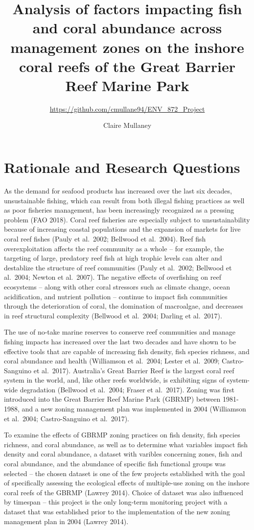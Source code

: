 \documentclass[12pt,]{article}
\title{Analysis of factors impacting fish and coral abundance across management
zones on the inshore coral reefs of the Great Barrier Reef Marine Park}
\subtitle{\url{https://github.com/cmullane94/ENV_872_Project}}
\author{Claire Mullaney}
\date{}
\begin{document}
\maketitle

\newpage
\tableofcontents 
\newpage
\listoftables 
\newpage
\listoffigures 
\newpage

\hypertarget{rationale-and-research-questions}{%
\section{Rationale and Research
Questions}\label{rationale-and-research-questions}}

As the demand for seafood products has increased over the last six
decades, unsustainable fishing, which can result from both illegal
fishing practices as well as poor fisheries management, has been
increasingly recognized as a pressing problem (FAO 2018). Coral reef
fisheries are especially subject to unsustainability because of
increasing coastal populations and the expansion of markets for live
coral reef fishes (Pauly et al.~2002; Bellwood et al.~2004). Reef fish
overexploitation affects the reef community as a whole -- for example,
the targeting of large, predatory reef fish at high trophic levels can
alter and destablize the structure of reef communities (Pauly et
al.~2002; Bellwood et al.~2004; Newton et al.~2007). The negative
effects of overfishing on reef ecosystems -- along with other coral
stressors such as climate change, ocean acidification, and nutrient
pollution -- continue to impact fish communities through the
deterioration of coral, the domination of macroalgae, and decreases in
reef structural complexity (Bellwood et al.~2004; Darling et al.~2017).

The use of no-take marine reserves to conserve reef communities and
manage fishing impacts has increased over the last two decades and have
shown to be effective tools that are capable of increasing fish density,
fish species richness, and coral abundance and health (Williamson et
al.~2004; Lester et al.~2009; Castro-Sanguino et al.~2017). Australia's
Great Barrier Reef is the largest coral reef system in the world, and,
like other reefs worldwide, is exhibiting signs of system-wide
degradation (Bellwood et al.~2004; Fraser et al.~2017). Zoning was first
introduced into the Great Barrier Reef Marine Park (GBRMP) between
1981-1988, and a new zoning management plan was implemented in 2004
(Williamson et al.~2004; Castro-Sanguino et al.~2017).

To examine the effects of GBRMP zoning practices on fish density, fish
species richness, and coral abundance, as well as to determine what
variables impact fish density and coral abundance, a dataset with
varibles concerning zones, fish and coral abundance, and the abundance
of specific fish functional groups was selected -- the chosen dataset is
one of the few projects established with the goal of specifically
assessing the ecological effects of multiple-use zoning on the inshore
coral reefs of the GBRMP (Lawrey 2014). Choice of dataset was also
influenced by timespan -- this project is the only long-term monitoring
project with a dataset that was established prior to the implementation
of the new zoning management plan in 2004 (Lawrey 2014).
\end{document}
